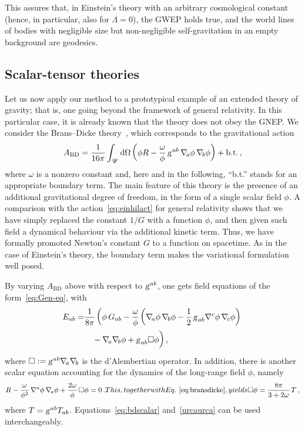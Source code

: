 \documentclass[a4paper,showkeys,aps,prd,reprint,nofootinbib,showpacs,twocolumn]{revtex4-1}
\newcommand{\de}{\mathrm{d}}
\newcommand{\ton}[1]{\left(#1\right)}
\newcommand{\subeq}[1]{\begin{subequations} #1 \end{subequations}}
\newcommand{\eq}[1]{\( #1 \)}
\newcommand{\eqd}[1]{\begin{equation} #1 \end{equation}}
\newcommand{\speq}[1]{\begin{equation}\begin{split}#1\end{split}\end{equation}}
\newcommand{\matg}{\text{\textsl{g}}}%
\theoremstyle{plain}
\begin{document}
This assures that, in Einstein's theory with an arbitrary cosmological constant (hence, in particular, also for \eq{\Lambda = 0}), the GWEP holds true, and the world lines of bodies with negligible size but non-negligible self-gravitation in an empty background are geodesics.

\subsection{Scalar-tensor theories}
\label{ss:scalartens}

Let us now apply our method to a prototypical example of an extended theory of gravity; that is, one going beyond the framework of general relativity.  In this particular case, it is already known that the theory does not obey the GNEP.  We consider the Brans--Dicke theory~\cite{faraoni:2004cos}, which corresponds to the gravitational action 
%
\eqd{A_{\text{BD}} = \frac{1}{16 \pi} \int_{\mathscr{U}} \de \Omega \ton{\phi R - \frac{\omega}{\phi} \, \matg^{ab} \, \nabla_{\! a} \phi\, \nabla_{\! b} \phi} + \text{b.t.} \,,
\label{eq:bdgravaction}}
%
where \eq{\omega} is a nonzero constant and, here and in the following, ``b.t.'' stands for an appropriate boundary term.  The main feature of this theory is the presence of an additional gravitational degree of freedom, in the form of a single scalar field \eq{\phi}.  A comparison with the action~\eqref{eq:einhilact} for general relativity shows that we have simply replaced the constant \eq{{1}/{G}} with a function \eq{\phi}, and then given such field a dynamical behaviour via the additional kinetic term.  Thus, we have formally promoted Newton's constant \eq{G} to a function on spacetime.   As in the case of Einstein's theory, the boundary term makes the variational formulation well posed.

By varying \eq{A_{\text{BD}}} above with respect to \eq{\matg^{ab}}, one gets field equations of the form~\eqref{eq:Gen-eq}, with 
%
\speq{\! E_{ab} = &\frac{1}{8\pi} \left(\phi \, G_{ab} - \frac{\omega}{\phi} \left(\nabla_{\! a} \phi \, \nabla_{\! b} \phi - \frac{1}{2} \, \matg_{ab}\nabla^c \phi \, \nabla_{\! c} \phi \right)\right. \\
&\quad- \nabla_{\! a} \nabla_{\! b} \phi + \matg_{ab} \square \phi \bigg) \,, \label{eq:bransdicke}}
%
where \eq{\square := \matg^{ab} \nabla_{\! a} \nabla_{\! b}} is the d'Alembertian operator. In addition, there is another scalar equation accounting for the dynamics of the long-range field \eq{\phi}, namely
%
\subeq{\eqd{R - \frac{\omega}{\phi^2} \, \nabla^{a} \phi \, \nabla_{\! a} \phi + \frac{2 \omega}{\phi} \, \square \phi = 0 \,. \label{eq:bdscalar}}
%
This, together with Eq.~\eqref{eq:bransdicke}, yields
%
\eqd{\square \phi = \frac{8 \pi}{3 + 2 \omega} \, T \,, \label{urcaurca}}}
%
where \eq{T = \matg^{ab} T_{ab}}.  Equations~\eqref{eq:bdscalar} and~\eqref{urcaurca} can be used interchangeably.
\end{document}
